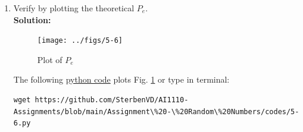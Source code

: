 \documentclass[journal,12pt,twocolumn]{IEEEtran}
\numberwithin{equation}{section}
\renewcommand\thesection{\arabic{section}}
\providecommand{\gitlink}[2]{{\color{blue}\href{https://github.com/SterbenVD/AI1110-Assignments/blob/main/Assignment\%20-\%20Random\%20Numbers/#1}{#2}}}
\newcommand{\solution}{\noindent \textbf{Solution: }}
\begin{document}
\begin{enumerate}[label=\thesection.\arabic*
        ,ref=\thesection.\theenumi]
\begin{align}
          \end{align}
    \item
          Verify by plotting  the theoretical $P_e$. \\
          \solution
          \begin{figure}[H]
              \centering
              \texttt{[image: ../figs/5-6]}
              \caption{Plot of $P_e$}
              \label{fig:5-6}
          \end{figure}
          The following \gitlink{codes/5-6.py}{python code} plots Fig. \ref{fig:5-6} or type in terminal:
          \begin{lstlisting}
wget https://github.com/SterbenVD/AI1110-Assignments/blob/main/Assignment\%20-\%20Random\%20Numbers/codes/5-6.py
              \end{lstlisting}
\end{enumerate}
\end{document}
